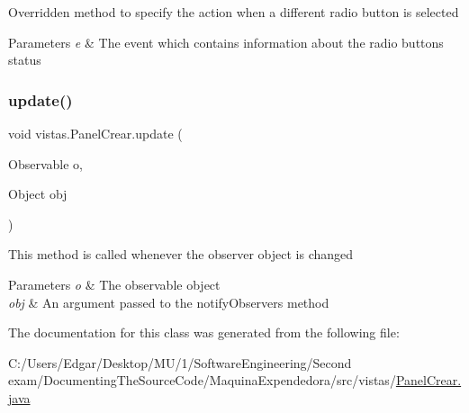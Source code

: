 Overridden method to specify the action when a different radio button is selected 
\begin{DoxyParams}{Parameters}
{\em e} & The event which contains information about the radio buttons\textquotesingle{} status \\
\hline
\end{DoxyParams}
\mbox{\label{classvistas_1_1_panel_crear_acf3b138f0c0c67c48a405b469eb37606}} 
\subsubsection{\texorpdfstring{update()}{update()}}
{\footnotesize\ttfamily void vistas.\+Panel\+Crear.\+update (\begin{DoxyParamCaption}\item[{Observable}]{o,  }\item[{Object}]{obj }\end{DoxyParamCaption})\hspace{0.3cm}{\ttfamily [inline]}}

This method is called whenever the observer object is changed 
\begin{DoxyParams}{Parameters}
{\em o} & The observable object \\
\hline
{\em obj} & An argument passed to the notify\+Observers method \\
\hline
\end{DoxyParams}


The documentation for this class was generated from the following file\+:\begin{DoxyCompactItemize}
\item 
C\+:/\+Users/\+Edgar/\+Desktop/\+M\+U/1/\+Software\+Engineering/\+Second exam/\+Documenting\+The\+Source\+Code/\+Maquina\+Expendedora/src/vistas/\mbox{\hyperlink{_panel_crear_8java}{Panel\+Crear.\+java}}\end{DoxyCompactItemize}
